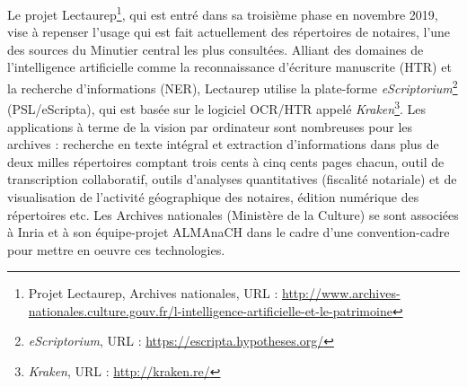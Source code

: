 Le projet Lectaurep\footnote{Projet Lectaurep, Archives nationales, URL : \url{http://www.archives-nationales.culture.gouv.fr/l-intelligence-artificielle-et-le-patrimoine}}, qui est entré dans sa troisième phase en novembre 2019, vise à repenser l'usage qui est fait actuellement des répertoires de notaires, l'une des sources du Minutier central les plus consultées. Alliant des domaines de l'intelligence artificielle comme la reconnaissance d'écriture manuscrite (HTR) et la recherche d'informations (NER), Lectaurep utilise  la plate-forme \textit{eScriptorium}\footnote{\textit{eScriptorium}, URL : \url{https://escripta.hypotheses.org/}} (PSL/eScripta), qui est basée sur le logiciel OCR/HTR appelé \textit{Kraken}\footnote{\textit{Kraken}, URL : \url{http://kraken.re/}}. Les applications à terme de la vision par ordinateur sont nombreuses pour les archives : recherche en texte intégral et extraction d'informations dans plus de deux milles répertoires comptant trois cents à cinq cents pages chacun, outil de transcription collaboratif, outils d'analyses quantitatives (fiscalité notariale) et de visualisation de l'activité géographique des notaires, édition numérique des répertoires etc. Les Archives nationales (Ministère de la Culture) se sont associées à Inria et à son équipe-projet ALMAnaCH dans le cadre d'une convention-cadre pour mettre en oeuvre ces technologies.

